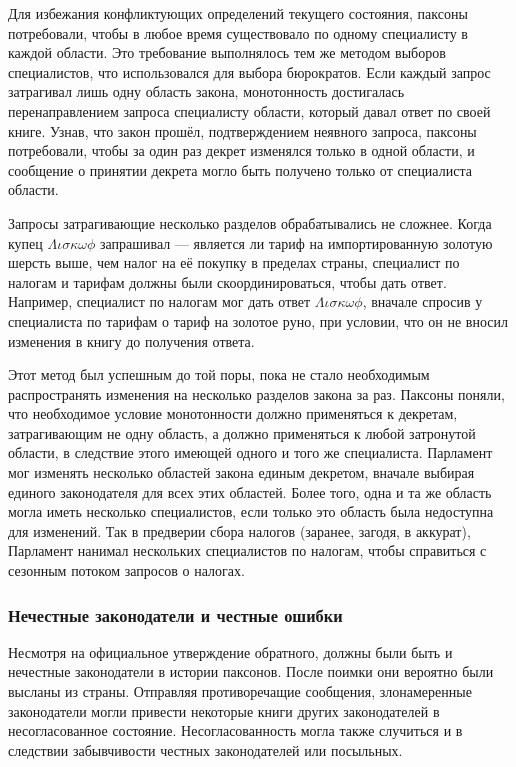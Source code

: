 \documentclass[12pt, a4paper]{article} %
\begin{document}
Для избежания конфликтующих определений текущего состояния, паксоны потребовали, чтобы в любое время существовало по одному специалисту в каждой области. Это требование выполнялось тем же методом выборов специалистов, что использовался для выбора бюрократов. Если каждый запрос затрагивал лишь одну область закона, монотонность достигалась перенаправлением запроса специалисту области, который давал ответ по своей книге. Узнав, что закон прошёл, подтверждением неявного запроса, паксоны потребовали, чтобы за один раз декрет изменялся только в одной области, и сообщение о принятии декрета могло быть получено только от специалиста области.

Запросы затрагивающие несколько разделов обрабатывались не сложнее. Когда купец $\Lambda\iota\sigma\kappa\omega\phi$ запрашивал --- является ли тариф на импортированную золотую шерсть выше, чем налог на её покупку в пределах страны, специалист по налогам и тарифам должны были скоординироваться, чтобы дать ответ. Например, специалист по налогам мог дать ответ $\Lambda\iota\sigma\kappa\omega\phi$, вначале спросив у специалиста по тарифам о тариф на золотое руно, при условии, что он не вносил изменения в книгу до получения ответа.

Этот метод был успешным до той поры, пока не стало необходимым распространять изменения на несколько разделов закона за раз. Паксоны поняли, что необходимое условие монотонности должно применяться к декретам, затрагивающим не одну область, а  должно применяться к любой затронутой области, в следствие этого имеющей одного и того же специалиста. Парламент мог изменять несколько областей закона единым декретом, вначале выбирая единого законодателя для всех этих областей. Более того, одна и та же область могла иметь несколько специалистов, если только это область была недоступна для изменений. Так в предверии сбора налогов (заранее, загодя, в аккурат), Парламент нанимал нескольких специалистов по налогам, чтобы справиться с сезонным потоком запросов о налогах.

\subsubsection{Нечестные законодатели и честные ошибки}\label{sec:evilorholy}

Несмотря на официальное утверждение обратного, должны были быть и нечестные законодатели в истории паксонов. После поимки они вероятно были высланы из страны. Отправляя противоречащие сообщения, злонамеренные законодатели могли привести некоторые книги других законодателей в несогласованное состояние. Несогласованность могла также случиться и в следствии забывчивости честных законодателей или посыльных.
\end{document}
